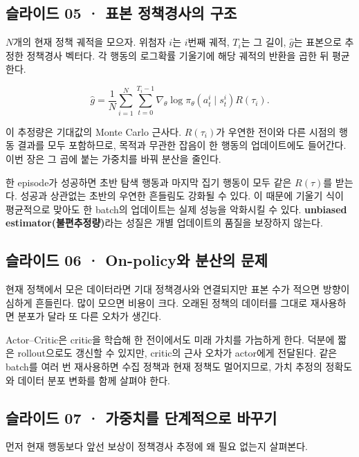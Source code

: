 \documentclass[11pt,a4paper]{article}
\begin{document}
\subsection{슬라이드 05 · 표본 정책경사의 구조}

$N$개의 현재 정책 궤적을 모으자. 위첨자 $i$는 $i$번째 궤적, $T_i$는 그 길이, $\widehat g$는 표본으로 추정한 정책경사 벡터다. 각 행동의 로그확률 기울기에 해당 궤적의 반환을 곱한 뒤 평균한다.\par

\[
\widehat g
=\frac1N\sum_{i=1}^N
\sum_{t=0}^{T_i-1}
\nabla_\theta\log\pi_\theta(a_t^i\mid s_t^i)R(\tau_i).
\]

이 추정량은 기대값의 Monte Carlo 근사다. $R(\tau_i)$가 우연한 전이와 다른 시점의 행동 결과를 모두 포함하므로, 목적과 무관한 잡음이 한 행동의 업데이트에도 들어간다. 이번 장은 그 곱에 붙는 가중치를 바꿔 분산을 줄인다.\par

한 episode가 성공하면 초반 탐색 행동과 마지막 집기 행동이 모두 같은 $R(\tau)$를 받는다. 성공과 상관없는 초반의 우연한 흔들림도 강화될 수 있다. 이 때문에 기울기 식이 평균적으로 맞아도 한 batch의 업데이트는 실제 성능을 악화시킬 수 있다. \textbf{unbiased estimator(불편추정량)}라는 성질은 개별 업데이트의 품질을 보장하지 않는다.\par

\subsection{슬라이드 06 · On-policy와 분산의 문제}

현재 정책에서 모은 데이터라면 기대 정책경사와 연결되지만 표본 수가 적으면 방향이 심하게 흔들린다. 많이 모으면 비용이 크다. 오래된 정책의 데이터를 그대로 재사용하면 분포가 달라 또 다른 오차가 생긴다.\par

Actor–Critic은 critic을 학습해 한 전이에서도 미래 가치를 가늠하게 한다. 덕분에 짧은 rollout으로도 갱신할 수 있지만, critic의 근사 오차가 actor에게 전달된다. 같은 batch를 여러 번 재사용하면 수집 정책과 현재 정책도 멀어지므로, 가치 추정의 정확도와 데이터 분포 변화를 함께 살펴야 한다.\par

\subsection{슬라이드 07 · 가중치를 단계적으로 바꾸기}

먼저 현재 행동보다 앞선 보상이 정책경사 추정에 왜 필요 없는지 살펴본다.\par
\end{document}
